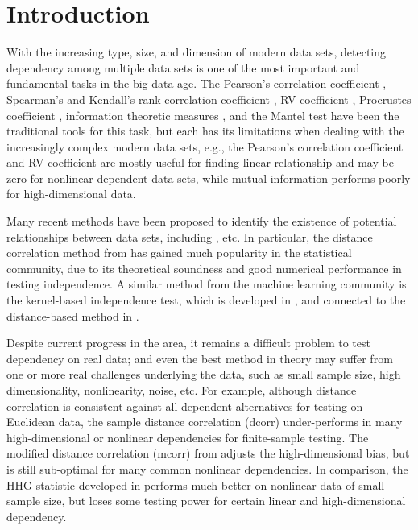 \documentclass[11pt]{article}
\begin{document}
\newpage
{}

\section{Introduction}
\label{sec:intro}
With the increasing type, size, and dimension of modern data sets, detecting dependency among multiple data sets is one of the most important and fundamental tasks in the big data age. The Pearson's correlation coefficient \cite{Pearson1895}, Spearman's and Kendall's rank correlation coefficient \cite{KendallBook}, RV coefficient \cite{RobertEscoufier1976}, Procrustes coefficient \cite{GowerProcrustesBook}, information theoretic measures \cite{Renyi1959}, and the Mantel test \cite{Mantel1967} have been the traditional tools for this task, but each has its limitations when dealing with the increasingly complex modern data sets, e.g., the Pearson's correlation coefficient and RV coefficient are mostly useful for finding linear relationship and may be zero for nonlinear dependent data sets, while mutual information performs poorly for high-dimensional data. 

Many recent methods have been proposed to identify the existence of potential relationships between data sets, including \cite{Baringhaus2004,TaskinenOjaRandles2005, GrettonEtAl2005, SzekelyRizzoBakirov2007, GrettonGyorfi2010,Reshef2011, HellerGorfine2013, Reimherr2013, SzekelyRizzo2013a, SzekelyRizzo2013b, RizzoSzekely2016}, etc. In particular, the distance correlation method from \cite{SzekelyRizzoBakirov2007, SzekelyRizzo2009, SzekelyRizzo2013a, SzekelyRizzo2014} has gained much popularity in the statistical community, due to its theoretical soundness and good numerical performance in testing independence. A similar method from the machine learning community is the kernel-based independence test, which is developed in \cite{GrettonEtAl2005, GrettonGyorfi2010, GrettonEtAl2012}, and connected to the distance-based method in \cite{SejdinovicEtAl2013}.

Despite  current progress in the area, it remains a difficult problem to test dependency on real data; and even the best method in theory may suffer from one or more real challenges underlying the data, such as small sample size, high dimensionality, nonlinearity, noise, etc. For example, although distance correlation is consistent against all dependent alternatives for testing on Euclidean data, the sample distance correlation (dcorr) under-performs in many high-dimensional or nonlinear dependencies for finite-sample testing. The modified distance correlation (mcorr) from \cite{SzekelyRizzo2013a} adjusts the high-dimensional bias, but is still sub-optimal for many common nonlinear dependencies. In comparison, the HHG statistic developed in \cite{HellerGorfine2013} performs much better on nonlinear data of small sample size, but  loses some testing power for certain linear and high-dimensional dependency.
\end{document}
